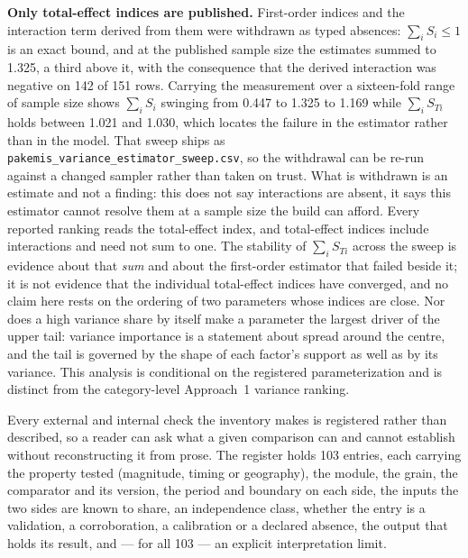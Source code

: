 \documentclass[essd]{copernicus}
\begin{document}
\textbf{Only total-effect indices are published.} First-order indices and the interaction term derived from them were withdrawn as typed absences: $\sum_i S_i \le 1$ is an exact bound, and at the published sample size the estimates summed to \num{1.325}, a third above it, with the consequence that the derived interaction was negative on \num{142} of \num{151} rows. Carrying the measurement over a sixteen-fold range of sample size shows $\sum_i S_i$ swinging from \num{0.447} to \num{1.325} to \num{1.169} while $\sum_i S_{Ti}$ holds between \num{1.021} and \num{1.030}, which locates the failure in the estimator rather than in the model. That sweep ships as \texttt{pakemis\_variance\_estimator\_sweep.csv}, so the withdrawal can be re-run against a changed sampler rather than taken on trust. What is withdrawn is an estimate and not a finding: this does not say interactions are absent, it says this estimator cannot resolve them at a sample size the build can afford. Every reported ranking reads the total-effect index, and total-effect indices include interactions and need not sum to one. The stability of $\sum_i S_{Ti}$ across the sweep is evidence about that \emph{sum} and about the first-order estimator that failed beside it; it is not evidence that the individual total-effect indices have converged, and no claim here rests on the ordering of two parameters whose indices are close. Nor does a high variance share by itself make a parameter the largest driver of the upper tail: variance importance is a statement about spread around the centre, and the tail is governed by the shape of each factor's support as well as by its variance. This analysis is conditional on the registered parameterization and is distinct from the category-level Approach~1 variance ranking.

Every external and internal check the inventory makes is registered rather than described, so a reader can ask what a given comparison can and cannot establish without reconstructing it from prose. The register holds \num{103} entries, each carrying the property tested (magnitude, timing or geography), the module, the grain, the comparator and its version, the period and boundary on each side, the inputs the two sides are known to share, an independence class, whether the entry is a validation, a corroboration, a calibration or a declared absence, the output that holds its result, and --- for all \num{103} --- an explicit interpretation limit.
\end{document}

